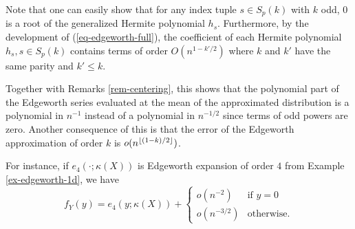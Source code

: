 \begin{remark} \label{rem-edge-mean}
    Note that one can easily show that for any index tuple $s \in S_p(k)$ with $k$ odd, 0 is a root of the generalized Hermite polynomial $h_s$. 
    Furthermore, by the development of (\ref{eq-edgeworth-full}), the coefficient of each Hermite polynomial $h_s, s \in S_p(k)$ contains terms of order $O(n^{1-k'/2})$ where $k$ and $k'$ have the same parity and $k' \leq k$.

    Together with Remarks \ref{rem-centering}, this shows that the polynomial part of the Edgeworth series evaluated at the mean of the approximated distribution is a polynomial in $n^{-1}$ instead of a polynomial in $n^{-1/2}$ since terms of odd powers are zero. Another consequence of this is that the error of the Edgeworth approximation of order $k$ is $o(n^{\lfloor(1-k)/2\rfloor})$. 
    
    For instance, if $e_4(\cdot; \kappa(X))$ is Edgeworth expansion of order $4$ from Example \ref{ex-edgeworth-1d}, we have
    \begin{equation*}
        f_Y(y) = e_4(y; \kappa(X)) + \begin{cases}
            o(n^{-2}) &\text{if } y = 0\\
            o(n^{-3/2}) &\text{otherwise}.
        \end{cases} 
    \end{equation*} 
\end{remark}
